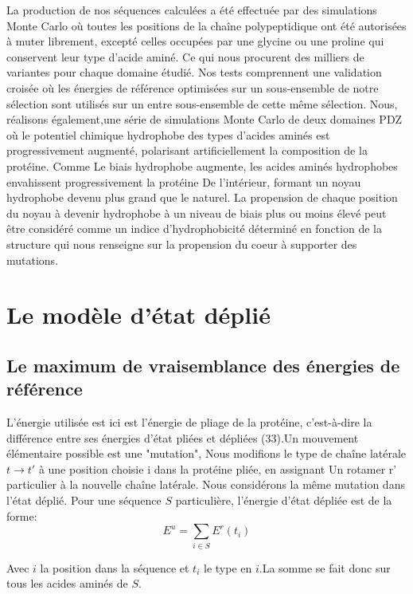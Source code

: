 La production de nos séquences calculées a été effectuée par des simulations Monte Carlo où toutes les positions de la chaîne polypeptidique ont été autorisées à muter librement, excepté celles occupées par une glycine ou une proline qui conservent leur type d'acide aminé. Ce qui nous procurent des milliers de variantes pour chaque domaine étudié. Nos tests comprennent une validation croisée où les énergies de référence optimisées sur un sous-ensemble de notre sélection sont utilisés sur un entre sous-ensemble de cette même sélection. Nous, réalisons également,une série de simulations Monte Carlo de deux domaines PDZ où le potentiel chimique hydrophobe des types d'acides aminés est progressivement augmenté, polarisant artificiellement la composition de la protéine. Comme Le biais hydrophobe augmente, les acides aminés hydrophobes envahissent progressivement  la protéine
De l'intérieur, formant un noyau hydrophobe devenu plus grand que le naturel.
La propension de chaque position du noyau à devenir hydrophobe à un niveau de biais plus ou moins élevé peut être considéré comme un indice d'hydrophobicité déterminé en fonction de la structure qui nous renseigne sur la propension du coeur à supporter des mutations.

\section{Le modèle d'état déplié}
\subsection{Le maximum de vraisemblance des énergies de référence}

L'énergie utilisée est ici est l'énergie de pliage de la protéine, c'est-à-dire la différence entre
ses énergies d'état pliées et dépliées (33).Un mouvement élémentaire possible est une "mutation",
Nous modifions le type de chaîne latérale $t \rightarrow t'$ à une position choisie i dans la protéine pliée, en assignant
Un rotamer r' particulier à la nouvelle chaîne latérale. Nous considérons la même mutation dans
l'état déplié. Pour une séquence $S$ particulière, l'énergie d'état dépliée est de la forme:
\begin{equation}
  E^u=\sum_{i\in S}E^r(t_i)
  \label{eq:unfolded}
\end{equation} 

Avec $i$ la position dans la séquence et $t_i$ le type en $i$.La somme se fait donc sur tous les acides aminés de $S$.

